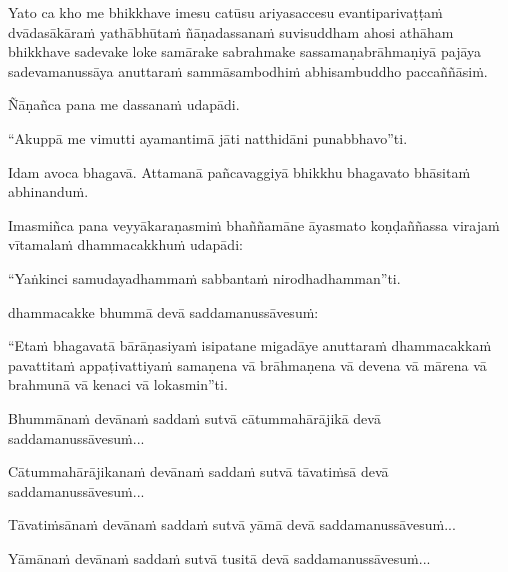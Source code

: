 \begin{pali-hang}
Yato ca kho me bhikkhave imesu catūsu ariyasaccesu evantiparivaṭṭaṁ dvādasākāraṁ yathābhūtaṁ ñāṇadassanaṁ suvisuddham ahosi athāham bhikkhave sadevake loke samārake sabrahmake sassamaṇabrāhmaṇiyā pajāya sadevamanussāya anuttaraṁ sammāsambodhiṁ abhisambuddho paccaññāsiṁ.
\end{pali-hang}

Ñāṇañca pana me dassanaṁ udapādi.

\begin{pali-hang}
``Akuppā me vimutti ayamantimā jāti natthidāni punabbhavo''ti.
\end{pali-hang}

\begin{pali-hang}
Idam avoca bhagavā. Attamanā pañcavaggiyā bhikkhu bhagavato bhāsitaṁ abhinanduṁ.
\end{pali-hang}

\begin{pali-hang}
Imasmiñca pana veyyākaraṇasmiṁ bhaññamāne āyasmato koṇḍaññassa virajaṁ vītamalaṁ dhammacakkhuṁ udapādi:
\end{pali-hang}

``Yaṅkinci samudayadhammaṁ sabbantaṁ nirodhadhamman''ti.

\begin{pali-hang}
 dhammacakke bhummā devā saddamanussāvesuṁ:
\end{pali-hang}

\begin{pali-hang}
``Etaṁ bhagavatā bārāṇasiyaṁ isipatane migadāye anuttaraṁ dhammacakkaṁ pavattitaṁ appaṭivattiyaṁ samaṇena vā brāhmaṇena vā devena vā mārena vā brahmunā vā kenaci vā lokasmin''ti.
\end{pali-hang}

\begin{pali-hang}
Bhummānaṁ devānaṁ saddaṁ sutvā cātummahārājikā devā saddamanussāvesuṁ...
\end{pali-hang}

\begin{pali-hang}
Cātummahārājikanaṁ devānaṁ saddaṁ sutvā tāvatiṁsā devā saddamanussāvesuṁ...
\end{pali-hang}

\begin{pali-hang}
Tāvatiṁsānaṁ devānaṁ saddaṁ sutvā yāmā devā saddamanussāvesuṁ...
\end{pali-hang}

\begin{pali-hang}
Yāmānaṁ devānaṁ saddaṁ sutvā tusitā devā saddamanussāvesuṁ...
\end{pali-hang}


